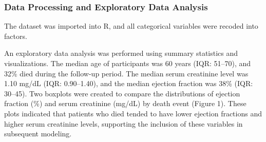 \documentclass[
  letterpaper,
  DIV=11,
  numbers=noendperiod]{scrartcl}
\begin{document}
\hypertarget{data-processing-and-exploratory-data-analysis}{%
\subsubsection{Data Processing and Exploratory Data
Analysis}\label{data-processing-and-exploratory-data-analysis}}

The dataset was imported into R, and all categorical variables were
recoded into factors.

An exploratory data analysis was performed using summary statistics and
visualizations. The median age of participants was 60 years (IQR:
51--70), and 32\% died during the follow-up period. The median serum
creatinine level was 1.10 mg/dL (IQR: 0.90--1.40), and the median
ejection fraction was 38\% (IQR: 30--45). Two boxplots were created to
compare the distributions of ejection fraction (\%) and serum creatinine
(mg/dL) by death event (Figure 1). These plots indicated that patients
who died tended to have lower ejection fractions and higher serum
creatinine levels, supporting the inclusion of these variables in
subsequent modeling.
\end{document}

